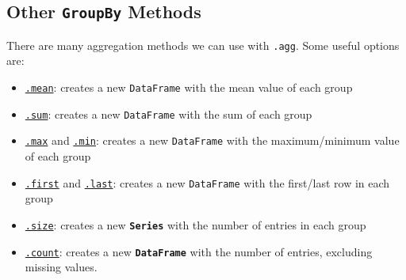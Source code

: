 \documentclass[
  letterpaper,
  DIV=11,
  numbers=noendperiod]{scrreprt}
\providecommand{\tightlist}{%
  \setlength{\itemsep}{0pt}\setlength{\parskip}{0pt}}\usepackage{longtable,booktabs,array}
\begin{document}
\subsection{\texorpdfstring{Other \texttt{GroupBy}
Methods}{Other GroupBy Methods}}\label{other-groupby-methods}

There are many aggregation methods we can use with \texttt{.agg}. Some
useful options are:

\begin{itemize}
\tightlist
\item
  \href{https://pandas.pydata.org/docs/reference/api/pandas.core.groupby.DataFrameGroupBy.mean.html\#pandas.core.groupby.DataFrameGroupBy.mean}{\texttt{.mean}}:
  creates a new \texttt{DataFrame} with the mean value of each group
\item
  \href{https://pandas.pydata.org/docs/reference/api/pandas.core.groupby.DataFrameGroupBy.sum.html\#pandas.core.groupby.DataFrameGroupBy.sum}{\texttt{.sum}}:
  creates a new \texttt{DataFrame} with the sum of each group
\item
  \href{https://pandas.pydata.org/docs/reference/api/pandas.core.groupby.DataFrameGroupBy.max.html\#pandas.core.groupby.DataFrameGroupBy.max}{\texttt{.max}}
  and
  \href{https://pandas.pydata.org/docs/reference/api/pandas.core.groupby.DataFrameGroupBy.min.html\#pandas.core.groupby.DataFrameGroupBy.min}{\texttt{.min}}:
  creates a new \texttt{DataFrame} with the maximum/minimum value of
  each group
\item
  \href{https://pandas.pydata.org/docs/reference/api/pandas.core.groupby.DataFrameGroupBy.first.html\#pandas.core.groupby.DataFrameGroupBy.first}{\texttt{.first}}
  and
  \href{https://pandas.pydata.org/docs/reference/api/pandas.core.groupby.DataFrameGroupBy.last.html\#pandas.core.groupby.DataFrameGroupBy.last}{\texttt{.last}}:
  creates a new \texttt{DataFrame} with the first/last row in each group
\item
  \href{https://pandas.pydata.org/docs/reference/api/pandas.core.groupby.DataFrameGroupBy.size.html\#pandas.core.groupby.DataFrameGroupBy.size}{\texttt{.size}}:
  creates a new \textbf{\texttt{Series}} with the number of entries in
  each group
\item
  \href{https://pandas.pydata.org/docs/reference/api/pandas.core.groupby.DataFrameGroupBy.count.html\#pandas.core.groupby.DataFrameGroupBy.count}{\texttt{.count}}:
  creates a new \textbf{\texttt{DataFrame}} with the number of entries,
  excluding missing values.
\end{itemize}
\end{document}

